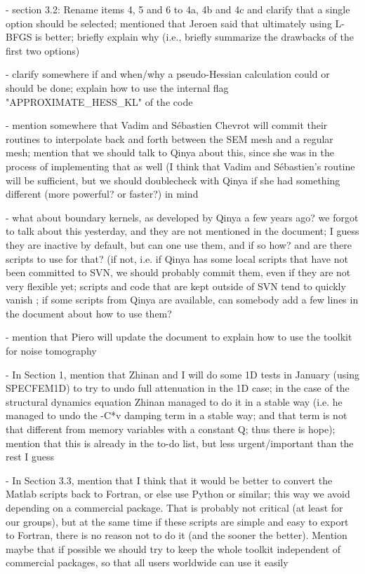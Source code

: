\documentclass[11pt]{article}
\begin{document}
- section 3.2: Rename items 4, 5 and 6 to 4a, 4b and 4c and clarify that a single option should be selected; mentioned that Jeroen said that ultimately using L-BFGS is better; briefly explain why (i.e., briefly summarize the drawbacks of the first two options)

- clarify somewhere if and when/why a pseudo-Hessian calculation could or should be done; explain how to use the internal flag "APPROXIMATE\_HESS\_KL" of the code

- mention somewhere that Vadim and Sébastien Chevrot will commit their routines to interpolate back and forth between the SEM mesh and a regular mesh; mention that we should talk to Qinya about this, since she was in the process of implementing that as well (I think that Vadim and Sébastien's routine will be sufficient, but we should doublecheck with Qinya if she had something different (more powerful? or faster?) in mind

- what about boundary kernels, as developed by Qinya a few years ago?
we forgot to talk about this yesterday, and they are not mentioned in the document; I guess they are inactive by default, but can one use them, and if so how? and are there scripts to use for that?
(if not, i.e. if Qinya has some local scripts that have not been committed to SVN, we should probably commit them, even if they are not very flexible yet; scripts and code that are kept outside of SVN tend to quickly vanish ; if some scripts from Qinya are available, can somebody add a few lines in the document about how to use them?

- mention that Piero will update the document to explain how to use the toolkit for noise tomography

- In Section 1, mention that Zhinan and I will do some 1D tests in January (using SPECFEM1D) to try to undo full attenuation in the 1D case; in the case of the structural dynamics equation Zhinan managed to do it in a stable way (i.e. he managed to undo the -C*v damping term in a stable way; and that term is not that different from memory variables with a constant Q; thus there is hope); mention that this is already in the to-do list, but less urgent/important than the rest I guess

- In Section 3.3, mention that I think that it would be better to convert the Matlab scripts back to Fortran, or else use Python or similar; this way we avoid depending on a commercial package. That is probably not critical (at least for our groups), but at the same time if these scripts are simple and easy to export to Fortran, there is no reason not to do it (and the sooner the better). Mention maybe that if possible we should try to keep the whole toolkit independent of commercial packages, so that all users worldwide can use it easily
\end{document}
